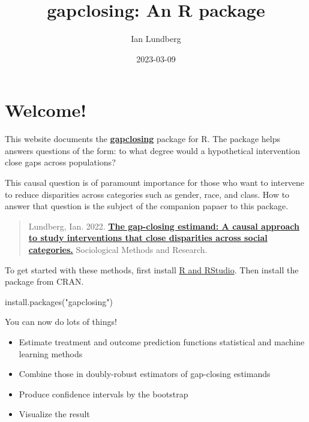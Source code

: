 \documentclass[
]{article}
\title{gapclosing: An R package}
\author{Ian Lundberg}
\date{2023-03-09}
\newenvironment{Shaded}{\begin{snugshade}}{\end{snugshade}}
\newcommand{\FunctionTok}[1]{\textcolor[rgb]{0.00,0.00,0.00}{#1}}
\newcommand{\NormalTok}[1]{#1}
\newcommand{\StringTok}[1]{\textcolor[rgb]{0.31,0.60,0.02}{#1}}
\providecommand{\tightlist}{%
  \setlength{\itemsep}{0pt}\setlength{\parskip}{0pt}}
\begin{document}
\maketitle

{
\setcounter{tocdepth}{2}
\tableofcontents
}
\hypertarget{welcome}{%
\section*{Welcome!}\label{welcome}}

This website documents the \href{https://cran.r-project.org/web/packages/gapclosing/}{\textbf{gapclosing}} package for R. The package helps answers questions of the form: to what degree would a hypothetical intervention close gaps across populations?

This causal question is of paramount importance for those who want to intervene to reduce disparities across categories such as gender, race, and class. How to answer that question is the subject of the companion papaer to this package.

\begin{quote}
Lundberg, Ian. 2022. \href{https://doi.org/10.1177/00491241211055769}{\textbf{The gap-closing estimand: A causal approach to study interventions that close disparities across social categories.}} Sociological Methods and Research.
\end{quote}

To get started with these methods, first install \href{https://rstudio-education.github.io/hopr/starting.html}{R and RStudio}. Then install the package from CRAN.

\begin{Shaded}
\begin{Highlighting}[]
\FunctionTok{install.packages}\NormalTok{(}\StringTok{"gapclosing"}\NormalTok{)}
\end{Highlighting}
\end{Shaded}

You can now do lots of things!

\begin{itemize}
\tightlist
\item
  Estimate treatment and outcome prediction functions statistical and machine learning methods
\item
  Combine those in doubly-robust estimators of gap-closing estimands
\item
  Produce confidence intervals by the bootstrap
\item
  Visualize the result
\end{itemize}
\end{document}
